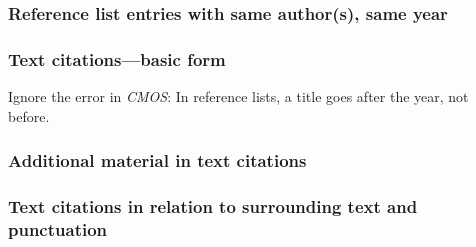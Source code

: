\documentclass[11pt,letterpaper,oneside]{article}
\begin{document}
\setcounter{subsubsection}{19}
\subsubsection{Reference list entries with same author(s), same year}
\label{15.20}

\begin{citeref}
\item \parencite[218]{fogel2004b}
\item \parencite[45--46]{fogel2004a}
\end{citeref}

\setcounter{subsubsection}{21}
\subsubsection{Text citations---basic form}
\label{15.22}

Ignore the error in \textit{CMOS}: In reference lists, a title goes
after the year, not before.

\begin{citeref}
\item \parencite{hetherington2015}
\item \parencite{grove2015}
\item \parencite{hetherington2015,grove2015}
\end{citeref}

\begin{citeref}
\item \parencite{doershuk2017}
\item \parencite{doershuk2016}
\end{citeref}

\setcounter{subsubsection}{23}
\subsubsection{Additional material in text citations}

\begin{citenoref}
\item \parencite[; t-tests are used here]{mandolan2017}
\end{citenoref}

\subsubsection{Text citations in relation to surrounding text and punctuation}
\label{15.25}
\end{document}
